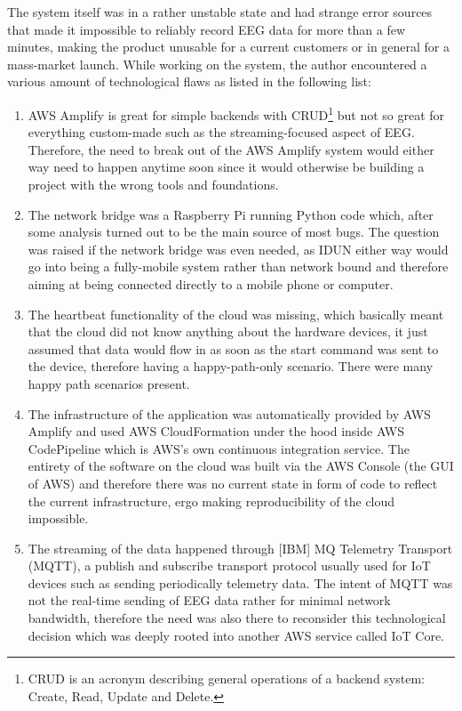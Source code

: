 The system itself was in a rather unstable state and had strange error sources that made it impossible to reliably record EEG data for more than a few minutes, making the product unusable for a current customers or in general for a mass-market launch. While working on the system, the author encountered a various amount of technological flaws as listed in the following list:

\begin{enumerate}
  \item AWS Amplify is great for simple backends with CRUD\footnote{CRUD is an acronym describing general operations of a backend system: Create, Read, Update and Delete.} but not so great for everything custom-made such as the streaming-focused aspect of EEG. Therefore, the need to break out of the AWS Amplify system would either way need to happen anytime soon since it would otherwise be building a project with the wrong tools and foundations.
  \item The network bridge was a Raspberry Pi running Python code which, after some analysis turned out to be the main source of most bugs. The question was raised if the network bridge was even needed, as IDUN either way would go into being a fully-mobile system rather than network bound and therefore aiming at being connected directly to a mobile phone or computer.
  \item The heartbeat functionality of the cloud was missing, which basically meant that the cloud did not know anything about the hardware devices, it just assumed that data would flow in as soon as the start command was sent to the device, therefore having a happy-path-only scenario. There were many happy path scenarios present.
   \item The infrastructure of the application was automatically provided by AWS Amplify and used AWS CloudFormation under the hood inside AWS CodePipeline which is AWS's own continuous integration service. The entirety of the software on the cloud was built via the AWS Console (the GUI of AWS) and therefore there was no current state in form of code to reflect the current infrastructure, ergo making reproducibility of the cloud impossible.
   \item The streaming of the data happened through [IBM] MQ Telemetry Transport (MQTT), a publish and subscribe transport protocol usually used for IoT devices such as sending periodically telemetry data. The intent of MQTT was not the real-time sending of EEG data rather for minimal network bandwidth, therefore the need was also there to reconsider this technological decision which was deeply rooted into another AWS service called IoT Core.

\end{enumerate}

